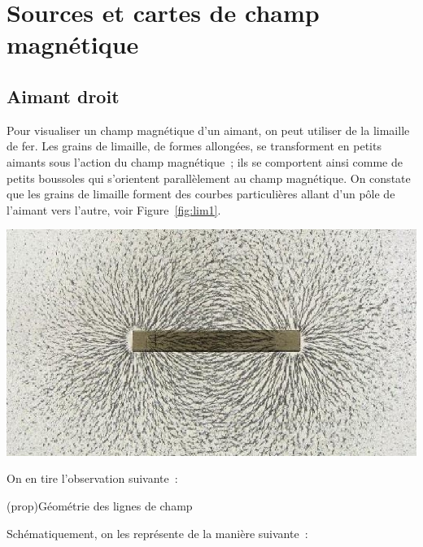 \documentclass[../../main/main.tex]{subfiles}
\begin{document}
\section{Sources et cartes de champ magnétique}
\subsection{Aimant droit}
\label{ssec:aimdroit}
\noindent
\begin{minipage}[c]{.48\linewidth}
  Pour visualiser un champ magnétique d'un aimant, on peut utiliser de la limaille
de fer. Les grains de limaille, de formes allongées, se transforment en petits
aimants sous l'action du champ magnétique~; ils se comportent ainsi comme de
petits boussoles qui s'orientent parallèlement au champ magnétique. On constate
que les grains de limaille forment des courbes particulières allant d'un pôle de
l'aimant vers l'autre, voir Figure~\ref{fig:lim1}.
\end{minipage}
\hfill
\begin{minipage}[c]{.48\linewidth}
  \begin{center}
	\includegraphics[scale=1]{aimdroit_lim.jpg}
	\label{fig:lim1}
  \end{center}
\end{minipage}

On en tire l'observation suivante~:
\begin{tcb*}(prop){Géométrie des lignes de champ}
\end{tcb*}
Schématiquement, on les représente de la manière suivante~:
\end{document}
